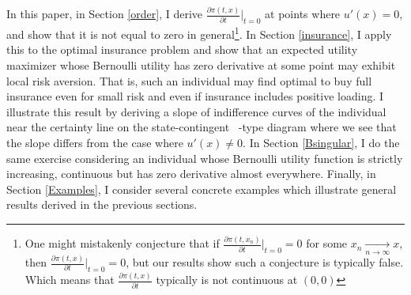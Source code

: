\documentclass[a4paper]{article}
\begin{document}
In this paper, in Section \ref{order},  I derive $\frac{\partial \pi(t, x)}{\partial t}\bigg|_{t=0}$ at points where $u'(x) = 0$, and show that it is not equal to zero in general\footnote{One might mistakenly conjecture  that if $\frac{\partial \pi(t, x_n)}{\partial t}\bigg|_{t=0}=0$ for some $x_n \underset{n \to \infty}{\to}x$, then $\frac{\partial \pi(t, x)}{\partial t}\bigg|_{t=0}=0$, but our results show such a conjecture is typically false. Which means that $\frac{\partial \pi(t, x)}{\partial t}$ typically is not continuous at $(0, 0)$}. In Section \ref{insurance}, I apply this to the optimal insurance problem and show that an expected utility maximizer whose Bernoulli utility has zero derivative at some point may exhibit local risk aversion. That is, such an individual may find optimal to buy full insurance even for small risk and even if insurance includes positive loading. I illustrate this result by deriving a slope of indifference curves of the individual near the certainty line on the state-contingent  \cite{yaari1978some}-type diagram where we see that the slope differs from the case where $u'(x) \neq 0$. In Section \ref{Bsingular}, I do the same exercise considering an individual whose Bernoulli utility function is strictly increasing, continuous but has zero derivative almost everywhere. Finally, in Section \ref{Examples}, I consider several concrete examples which illustrate general results derived in the previous sections. 
\end{document}
